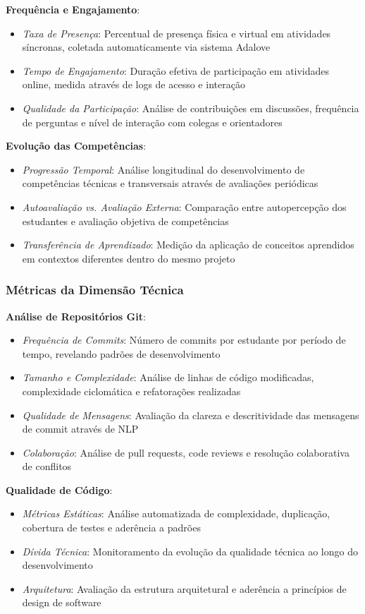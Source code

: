 \documentclass[12pt, a4paper, oneside]{abntex2}
\begin{document}
\textbf{Frequência e Engajamento}: 
\begin{itemize}
\item \textit{Taxa de Presença}: Percentual de presença física e virtual em atividades síncronas, coletada automaticamente via sistema Adalove
\item \textit{Tempo de Engajamento}: Duração efetiva de participação em atividades online, medida através de logs de acesso e interação
\item \textit{Qualidade da Participação}: Análise de contribuições em discussões, frequência de perguntas e nível de interação com colegas e orientadores
\end{itemize}

\textbf{Evolução das Competências}:
\begin{itemize}
\item \textit{Progressão Temporal}: Análise longitudinal do desenvolvimento de competências técnicas e transversais através de avaliações periódicas
\item \textit{Autoavaliação vs. Avaliação Externa}: Comparação entre autopercepção dos estudantes e avaliação objetiva de competências
\item \textit{Transferência de Aprendizado}: Medição da aplicação de conceitos aprendidos em contextos diferentes dentro do mesmo projeto
\end{itemize}

\subsubsection{Métricas da Dimensão Técnica}

\textbf{Análise de Repositórios Git}:
\begin{itemize}
\item \textit{Frequência de Commits}: Número de commits por estudante por período de tempo, revelando padrões de desenvolvimento
\item \textit{Tamanho e Complexidade}: Análise de linhas de código modificadas, complexidade ciclomática e refatorações realizadas
\item \textit{Qualidade de Mensagens}: Avaliação da clareza e descritividade das mensagens de commit através de NLP
\item \textit{Colaboração}: Análise de pull requests, code reviews e resolução colaborativa de conflitos
\end{itemize}

\textbf{Qualidade de Código}:
\begin{itemize}
\item \textit{Métricas Estáticas}: Análise automatizada de complexidade, duplicação, cobertura de testes e aderência a padrões
\item \textit{Dívida Técnica}: Monitoramento da evolução da qualidade técnica ao longo do desenvolvimento
\item \textit{Arquitetura}: Avaliação da estrutura arquitetural e aderência a princípios de design de software
\end{itemize}
\end{document}
